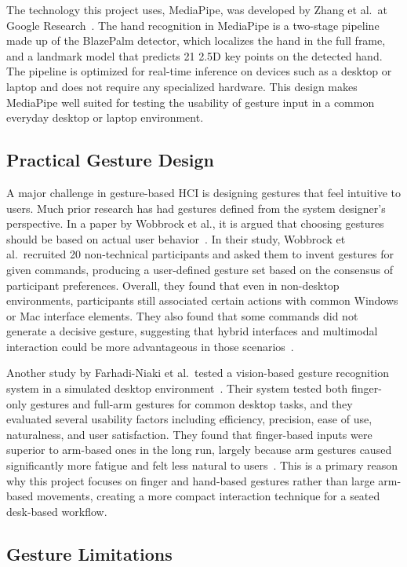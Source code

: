 \documentclass[manuscript]{acmart}
\begin{document}
The technology this project uses, MediaPipe, was developed by Zhang et al.\ at Google Research~\cite{zhang2020}. The hand recognition in MediaPipe is a two-stage pipeline made up of the BlazePalm detector, which localizes the hand in the full frame, and a landmark model that predicts 21 2.5D key points on the detected hand. The pipeline is optimized for real-time inference on devices such as a desktop or laptop and does not require any specialized hardware. This design makes MediaPipe well suited for testing the usability of gesture input in a common everyday desktop or laptop environment.

\subsection{Practical Gesture Design}

A major challenge in gesture-based HCI is designing gestures that feel intuitive to users. Much prior research has had gestures defined from the system designer's perspective. In a paper by Wobbrock et al., it is argued that choosing gestures should be based on actual user behavior~\cite{wobbrock2009}. In their study, Wobbrock et al.\ recruited 20 non-technical participants and asked them to invent gestures for given commands, producing a user-defined gesture set based on the consensus of participant preferences. Overall, they found that even in non-desktop environments, participants still associated certain actions with common Windows or Mac interface elements. They also found that some commands did not generate a decisive gesture, suggesting that hybrid interfaces and multimodal interaction could be more advantageous in those scenarios~\cite{wobbrock2009}.

Another study by Farhadi-Niaki et al.\ tested a vision-based gesture recognition system in a simulated desktop environment~\cite{farhadi2013}. Their system tested both finger-only gestures and full-arm gestures for common desktop tasks, and they evaluated several usability factors including efficiency, precision, ease of use, naturalness, and user satisfaction. They found that finger-based inputs were superior to arm-based ones in the long run, largely because arm gestures caused significantly more fatigue and felt less natural to users~\cite{farhadi2013}. This is a primary reason why this project focuses on finger and hand-based gestures rather than large arm-based movements, creating a more compact interaction technique for a seated desk-based workflow.

\subsection{Gesture Limitations}
\end{document}
